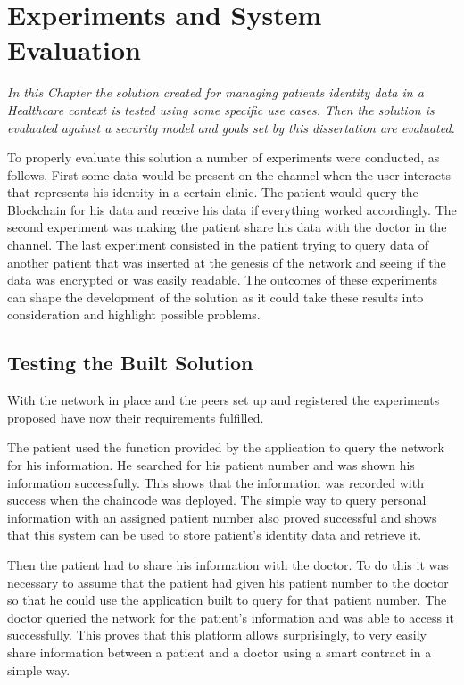 \chapter{Experiments and System Evaluation} 
\label{experiments}

\emph{In this Chapter the solution created for managing patients identity data
in a Healthcare context is tested using some specific use cases. Then the
solution is evaluated against a security model and goals set by this
dissertation are evaluated.}

To properly evaluate this solution a number of experiments were conducted, as
follows. First some data would be present on the channel when the user
interacts that represents his identity in a certain clinic. The patient would
query the Blockchain for his data and receive his data if everything worked
accordingly. The second experiment was making the patient share his data with
the doctor in the channel. The last experiment consisted in the patient trying
to query data of another patient that was inserted at the genesis of the
network and seeing if the data was encrypted or was easily readable. The
outcomes of these experiments can shape the development of the solution as it
could take these results into consideration and highlight possible problems.

\section{Testing the Built Solution}

With the network in place and the peers set up and registered the experiments
proposed have now their requirements fulfilled.

The patient used the function provided by the application to query the network
for his information. He searched for his patient number and was shown his
information successfully. This shows that the information was recorded with
success when the chaincode was deployed. The simple way to query personal
information with an assigned patient number also proved successful and shows
that this system can be used to store patient's identity data and retrieve it.

Then the patient had to share his information with the doctor. To do this it
was necessary to assume that the patient had given his patient number to the
doctor so that he could use the application built to query for that patient
number. The doctor queried the network for the patient's information and was
able to access it successfully. This proves that this platform allows
surprisingly, to very easily share information between a patient and a doctor
using a smart contract in a simple way.

